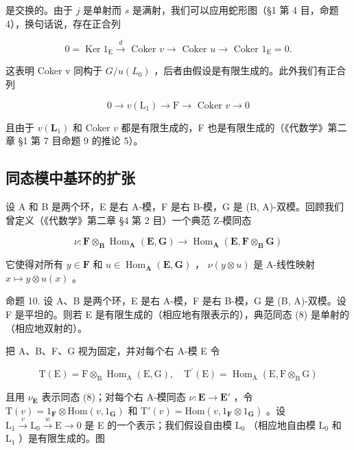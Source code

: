 是交换的。由于 \(j\) 是单射而 \(s\) 是满射，我们可以应用蛇形图（§1 第 4 目，命题 4），换句话说，存在正合列

\[
0 = \operatorname{Ker} 1 _ {\mathrm{E}} \xrightarrow {d} \text { Coker } v \longrightarrow \text { Coker } u \longrightarrow \text { Coker } 1 _ {\mathrm{E}} = 0.
\]

这表明 Coker v 同构于 \(G/u(L_{0})\) ，后者由假设是有限生成的。此外我们有正合列

\[
0 \rightarrow v (\mathrm{L} _ {1}) \rightarrow \mathrm{F} \rightarrow \text { Coker } v \rightarrow 0
\]

且由于 \(v(\mathbf{L}_1)\) 和 Coker \(v\) 都是有限生成的，F 也是有限生成的（《代数学》第二章 §1 第 7 目命题 9 的推论 5）。

\subsection{同态模中基环的扩张}

设 A 和 B 是两个环，E 是右 A-模，F 是右 B-模，G 是 (B, A)-双模。回顾我们曾定义（《代数学》第二章 §4 第 2 目）一个典范 Z-模同态

\[
\nu \colon \mathbf {F} \otimes_ {\mathbf {B}} \operatorname{Hom} _ {\mathbf {A}} (\mathbf {E}, \mathbf {G}) \rightarrow \operatorname{Hom} _ {\mathbf {A}} (\mathbf {E}, \mathbf {F} \otimes_ {\mathbf {B}} \mathbf {G})\tag{8}
\]

它使得对所有 \(y \in \mathbf{F}\) 和 \(u \in \operatorname{Hom}_{\mathbf{A}}(\mathbf{E}, \mathbf{G})\) ， \(\nu(y \otimes u)\) 是 A-线性映射 \(x \mapsto y \otimes u(x)\) 。

命题 10. 设 A、B 是两个环，E 是右 A-模，F 是右 B-模，G 是 (B, A)-双模。设 F 是平坦的。则若 E 是有限生成的（相应地有限表示的），典范同态 (8) 是单射的（相应地双射的）。

把 A、B、F、G 视为固定，并对每个右 A-模 E 令

\[
\mathrm{T} (\mathrm{E}) = \mathrm{F} \otimes_ {\mathrm{B}} \operatorname{Hom} _ {\mathrm{A}} (\mathrm{E}, \mathrm{G}), \quad \mathrm{T} ^ {\prime} (\mathrm{E}) = \operatorname{Hom} _ {\mathrm{A}} (\mathrm{E}, \mathrm{F} \otimes_ {\mathrm{B}} \mathrm{G})
\]

且用 \(\nu_{\mathbf{E}}\) 表示同态 (8)；对每个右 A-模同态 \(\nu: \mathbf{E} \to \mathbf{E}'\) ，令 \(\mathrm{T}(v) = 1_{\mathbf{F}} \otimes \mathrm{Hom}(v, 1_{\mathbf{G}})\) 和 \(\mathrm{T}'(v) = \mathrm{Hom}(v, 1_{\mathbf{F}} \otimes 1_{\mathbf{G}})\) 。设 \(\mathrm{L}_1 \xrightarrow{v} \mathrm{L}_0 \xrightarrow{w} \mathrm{E} \to 0\) 是 E 的一个表示；我们假设自由模 \(\mathrm{L}_0\) （相应地自由模 \(\mathrm{L}_0\) 和 \(\mathrm{L}_1\) ）是有限生成的。图

